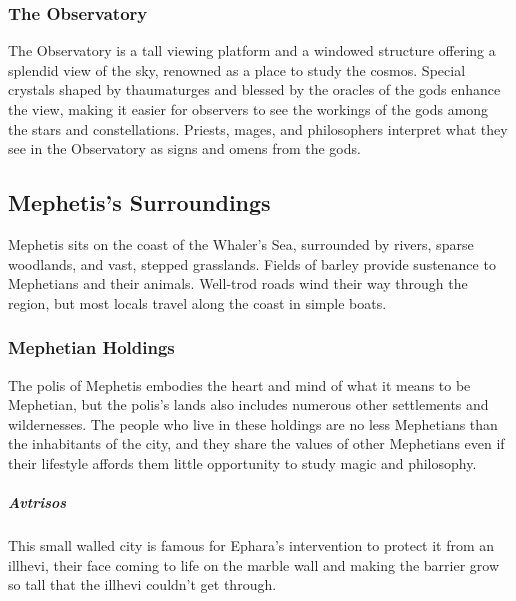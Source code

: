     \subsubsection{The Observatory}
        The Observatory is a tall viewing platform and a windowed structure offering a splendid view of the sky, renowned as a place to study the cosmos.
        Special crystals shaped by thaumaturges and blessed by the oracles of the gods enhance the view, making it easier for observers to see the workings of the gods among the stars and constellations.
        Priests, mages, and philosophers interpret what they see in the Observatory as signs and omens from the gods.


\subsection*{Mephetis's Surroundings}
    Mephetis sits on the coast of the Whaler's Sea, surrounded by rivers, sparse woodlands, and vast, stepped grasslands.
    Fields of barley provide sustenance to Mephetians and their animals.
    Well-trod roads wind their way through the region, but most locals travel along the coast in simple boats.

    \subsubsection{Mephetian Holdings}
        The polis of Mephetis embodies the heart and mind of what it means to be Mephetian, but the polis's lands also includes numerous other settlements and wildernesses.
        The people who live in these holdings are no less Mephetians than the inhabitants of the city, and they share the values of other Mephetians even if their lifestyle affords them little opportunity to study magic and philosophy.

        \subparagraph{Avtrisos} This small walled city is famous for Ephara's intervention to protect it from an illhevi, their face coming to life on the marble wall and making the barrier grow so tall that the illhevi couldn't get through.

